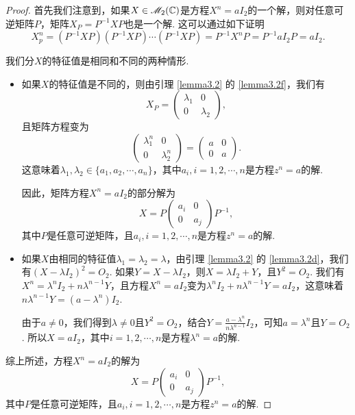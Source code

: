 \begin{proof}
  首先我们注意到，如果$X\in\mathscr M_2(\mathbb C)$是方程$X^n=aI_2$的一个解，则对任意可逆矩阵$P$，矩阵$X_P=P^{-1}XP$也是一个解. 这可以通过如下证明
  \[
    X_p^n = (P^{-1}XP)(P^{-1}XP)\cdots (P^{-1}XP) = P^{-1}X^nP = P^{-1}aI_2P = aI_2.
  \]

  我们分$X$的特征值是相同和不同的两种情形.
  \begin{itemize}\parindent=2em
    \item 如果$X$的特征值是不同的，则由引理 \ref{lemma3.2} 的 \ref{lemma3.2f}，我们有
        \[
          X_P = \begin{pmatrix}
            \lambda_1 & 0 \\
            0 & \lambda_2
          \end{pmatrix},
        \]
        且矩阵方程变为
        \[
          \begin{pmatrix}
            \lambda_1^n & 0 \\
            0 & \lambda_2^n
          \end{pmatrix} = \begin{pmatrix}
            a & 0 \\
            0 & a
          \end{pmatrix}.
        \]
        这意味着$\lambda_1,\lambda_2\in\{a_1,a_2,\cdots,a_n\}$，其中$a_i,i=1,2,\cdots,n$是方程$z^n=a$的解.

        因此，矩阵方程$X^n=aI_2$的部分解为
        \[
          X = P\begin{pmatrix}
            a_i & 0 \\
            0 & a_j
          \end{pmatrix}P^{-1},
        \]
        其中$P$是任意可逆矩阵，且$a_i,i=1,2,\cdots,n$是方程$z^n=a$的解.
    \item 如果$X$由相同的特征值$\lambda_1=\lambda_2=\lambda$，由引理 \ref{lemma3.2} 的 \ref{lemma3.2d}，我们有$(X-\lambda I_2)^2=O_2$. 如果$Y=X-\lambda I_2$，则$X=\lambda I_2+Y$，且$Y^2=O_2$. 我们有$X^n=\lambda^nI_2+n\lambda^{n-1}Y$，且方程$X^n=aI_2$变为$\lambda^nI_2+n\lambda^{n-1}Y=aI_2$，这意味着$n\lambda^{n-1}Y=(a-\lambda^n)I_2$.

        由于$a\ne0$，我们得到$\lambda\ne0$且$Y^2=O_2$，结合$Y=\frac{a-\lambda^n}{n\lambda^{n-1}}I_2$，可知$a=\lambda^n$且$Y=O_2$. 所以$X=aI_2$，其中$i=1,2,\cdots,n$是方程$\lambda^n=a$的解.
  \end{itemize}

  综上所述，方程$X^n=aI_2$的解为
  \[
    X = P\begin{pmatrix}
      a_i & 0 \\
      0 & a_j
    \end{pmatrix}P^{-1},
  \]
  其中$P$是任意可逆矩阵，且$a_i,i=1,2,\cdots,n$是方程$z^n=a$的解.

\end{proof}

